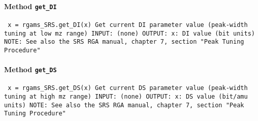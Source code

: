 \paragraph{Method \texttt{get_DI}}
\vspace{1ex}
\texttt{\newline
x = rgams_SRS.get_DI(x)\newline
\newline
Get current DI parameter value (peak-width tuning at low mz range)\newline
\newline
INPUT:\newline
(none)\newline
\newline
OUTPUT:\newline
x: DI value (bit units)\newline
\newline
NOTE:\newline
See also the SRS RGA manual, chapter 7, section "Peak Tuning Procedure"\newline
\newline
}

\paragraph{Method \texttt{get_DS}}
\vspace{1ex}
\texttt{\newline
x = rgams_SRS.get_DS(x)\newline
\newline
Get current DS parameter value (peak-width tuning at high mz range)\newline
\newline
INPUT:\newline
(none)\newline
\newline
OUTPUT:\newline
x: DS value (bit/amu units)\newline
\newline
NOTE:\newline
See also the SRS RGA manual, chapter 7, section "Peak Tuning Procedure"\newline
\newline
}

